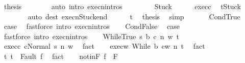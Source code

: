 \begin{isabellebody}
\ {\isacharquery}thesis\isanewline
\ \ \ \ \ \ \isamarkupfalse%
\ {\isacharparenleft}auto\ intro{\isacharcolon}\ execn{\isachardot}intros{\isacharparenright}\isanewline
\ \ \isamarkupfalse%
\isanewline
\ \ \ \ \isamarkupfalse%
\ Stuck\isanewline
\ \ \ \ \isamarkupfalse%
\ exec{\isacharunderscore}c{}\ \isamarkupfalse%
\ {\isachardoublequoteopen}t{\isacharequal}Stuck{\isachardoublequoteclose}\isanewline
\ \ \ \ \ \ \isamarkupfalse%
\ {\isacharparenleft}auto\ dest{\isacharcolon}\ execn{\isacharunderscore}Stuck{\isacharunderscore}end{\isacharparenright}\isanewline
\ \ \ \ \isamarkupfalse%
\ t\ \isamarkupfalse%
\ {\isacharquery}thesis\ \isamarkupfalse%
\ simp\isanewline
\ \ \isamarkupfalse%
\isanewline
{}\isamarkupfalse%
\isanewline
\ \ \isamarkupfalse%
\ CondTrue\ \isamarkupfalse%
\ {\isacharquery}case\ \isamarkupfalse%
\ {\isacharparenleft}fastforce\ intro{\isacharcolon}\ execn{\isachardot}intros{\isacharparenright}\isanewline
{}\isamarkupfalse%
\isanewline
\ \ \isamarkupfalse%
\ CondFalse\ \isamarkupfalse%
\ {\isacharquery}case\ \isamarkupfalse%
\ {\isacharparenleft}fastforce\ intro{\isacharcolon}\ execn{\isachardot}intros{\isacharparenright}\isanewline
{}\isamarkupfalse%
\isanewline
\ \ \isamarkupfalse%
\ {\isacharparenleft}WhileTrue\ s\ b\ c\ n\ w\ t{\isacharparenright}\ \isanewline
\ \ \isamarkupfalse%
\ exec{\isacharunderscore}c{\isacharcolon}\ {\isachardoublequoteopen}{\isasymGamma}{\isasymturnstile}{\isasymlangle}c{\isacharcomma}Normal\ s{\isasymrangle}\ {\isacharequal}n{\isasymRightarrow}\ w{\isachardoublequoteclose}\ \isamarkupfalse%
\ fact\isanewline
\ \ \isamarkupfalse%
\ exec{\isacharunderscore}w{\isacharcolon}\ {\isachardoublequoteopen}{\isasymGamma}{\isasymturnstile}{\isasymlangle}While\ b\ c{\isacharcomma}w{\isasymrangle}\ {\isacharequal}n{\isasymRightarrow}\ t{\isachardoublequoteclose}\ \isamarkupfalse%
\ fact\isanewline
\ \ \isamarkupfalse%
\ t{\isacharcolon}\ {\isachardoublequoteopen}t\ {\isacharequal}\ Fault\ f{\isachardoublequoteclose}\ \isamarkupfalse%
\ fact\isanewline
\ \ \isamarkupfalse%
\ notinF{\isacharcolon}\ {\isachardoublequoteopen}f\ {\isasymnotin}\ F{\isachardoublequoteclose}\ \isamarkupfalse%

\end{isabellebody}

